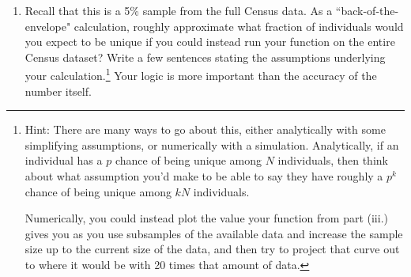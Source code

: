 \documentclass[11pt]{article}
\begin{document}
\begin{enumerate}[leftmargin=*]
\begin{enumerate}
\begin{enumerate}
        \item 
        Recall that this is a 5\% sample from the full Census data.   As a ``back-of-the-envelope" calculation, roughly approximate what fraction of individuals would you expect to be unique if you could instead run your function on the entire Census dataset? Write a few sentences stating the assumptions underlying your calculation.\footnote{Hint: There are many ways to go about this, either analytically with some simplifying assumptions, or numerically with a simulation.  Analytically, if an individual has a $p$ chance of being unique among $N$ individuals, then think about what assumption you'd make to be able to say they have roughly a $p^k$ chance of being unique among $kN$ individuals.  

        Numerically, you could instead plot the value your function from part (iii.) gives you as you use subsamples of the available data and increase the sample size up to the current size of the data, and then try to project that curve out to where it would be with 20 times that amount of data.}   Your logic is more important than the accuracy of the number itself.  

        
    \end{enumerate}
\end{enumerate}


\end{enumerate}
\iffalse
\begin{thebibliography}

\bibitem{CormenLeRiSt09} Cormen, Thomas H. and Leiserson, Charles E. and Rivest, Ronald L. and Stein, Clifford, ``Introduction to Algorithms, Third Edition", \emph{The MIT Press}, 2009.

\end{thebibliography}
\fi

\newpage
\vspace{-1cm}

\end{document}
